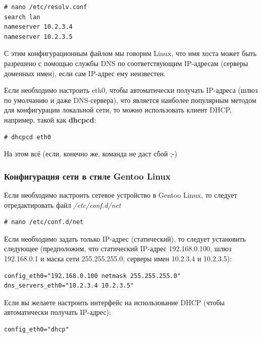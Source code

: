 \documentclass[10pt]{book}
\begin{document}
\begin{tcolorbox}
\begin{lstlisting}
# nano /etc/resolv.conf
search lan
nameserver 10.2.3.4
nameserver 10.2.3.5
\end{lstlisting}
\end{tcolorbox}

С этим конфигурационным файлом мы говорим Linux, что имя хоста может быть разрешено с помощью службы DNS по соответствующим IP-адресам (серверы доменных имен), если сам IP-адрес ему неизвестен.

Если необходимо настроить eth0, чтобы автоматически получать IP-адреса (шлюз по умолчанию и даже DNS-сервера), что является наиболее популярным методом для конфигурации локальной сети, то можно использовать клиент DHCP, например, такой как \textbf{dhcpcd}:

\begin{tcolorbox}
\begin{lstlisting}
# dhcpcd eth0
\end{lstlisting}
\end{tcolorbox}

На этом всё (если, конечно же, команда не даст сбой ;-)

\subsubsection{Конфигурация сети в стиле Gentoo Linux}
Если необходимо настроить сетевое устройство в Gentoo Linux, то следует отредактировать файл \textit{/etc/conf.d/net}

\begin{tcolorbox}
\begin{lstlisting}
# nano /etc/conf.d/net
\end{lstlisting}
\end{tcolorbox}

Если необходимо задать только IP-адрес (статический), то следует установить  следующее (предположим, что статический IP-адрес 192.168.0.100, шлюз 192.168.0.1 и маска сети 255.255.255.0, серверы имен 10.2.3.4 и 10.2.3.5):

\begin{tcolorbox}
\begin{lstlisting}
config_eth0="192.168.0.100 netmask 255.255.255.0"
dns_servers_eth0="10.2.3.4 10.2.3.5"
\end{lstlisting}
\end{tcolorbox}

Если вы желаете настроить интерфейс на использование DHCP (чтобы автоматически получать IP-адрес):
\begin{tcolorbox}
\begin{lstlisting}
config_eth0="dhcp"
\end{lstlisting}
\end{tcolorbox}
\end{document}
